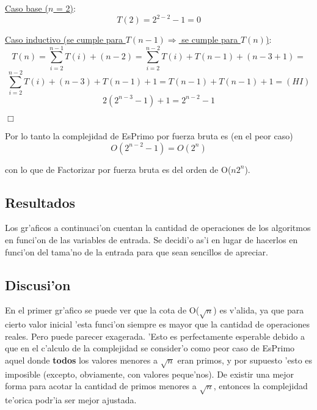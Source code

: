 \underline{Caso base ($n$ = 2)}:
$$T(2) = 2^{2-2} - 1 = 0$$

\underline{Caso inductivo (se cumple para $T(n-1) \Longrightarrow$ se cumple para $T(n)$)}:
$$T(n) = \sum_{i=2}^{n-1}{T(i)} + (n-2) = \sum_{i=2}^{n-2}{T(i)} + T(n-1) + (n-3+1) =$$
$$\sum_{i=2}^{n-2}{T(i)} + (n-3) + T(n-1) + 1 = T(n-1) + T(n-1) + 1 =  (HI)$$
$$2(2^{n-3} - 1) + 1 = 2^{n-2} - 1 $$
\begin{flushright}
$\Box$   
\end{flushright}

Por lo tanto la complejidad de EsPrimo por fuerza bruta es (en el peor caso)
$$O(2^{n-2}-1) = O(2^n)$$

con lo que de Factorizar por fuerza bruta es del orden de O($n2^n$).



\clearpage
\subsection{Resultados}
Los gr'aficos a continuaci'on cuentan la cantidad de operaciones de los algoritmos en funci'on de las variables de entrada. Se decidi'o as'i en lugar de hacerlos en funci'on del tama'no de la entrada para que sean sencillos de apreciar.

\clearpage


\subsection{Discusi'on}
En el primer gr'afico se puede ver que la cota de O($\sqrt{n}$) es v'alida, ya que para cierto valor inicial 'esta funci'on siempre es mayor que la cantidad de operaciones reales. Pero puede parecer exagerada. 'Esto es perfectamente esperable debido a que en el c'alculo de la complejidad se consider'o como peor caso de EsPrimo aquel donde {\bf todos} los valores menores a $\sqrt{n}$ eran primos, y por supuesto 'esto es imposible (excepto, obviamente, con valores peque'nos). De existir una mejor forma para acotar la cantidad de primos menores a $\sqrt{n}$, entonces la complejidad te'orica podr'ia ser mejor ajustada.

